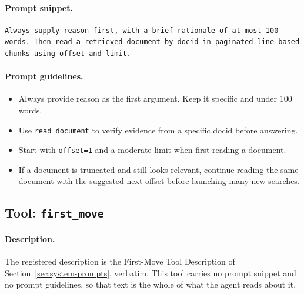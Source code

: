 \paragraph{Prompt snippet.}
\begin{verbatim}
Always supply reason first, with a brief rationale of at most 100
words. Then read a retrieved document by docid in paginated line-based
chunks using offset and limit.
\end{verbatim}

\paragraph{Prompt guidelines.}
\begin{itemize}
  \item Always provide reason as the first argument. Keep it specific and under 100 words.
  \item Use \texttt{read\_document} to verify evidence from a specific docid before answering.
  \item Start with \texttt{offset=1} and a moderate limit when first reading a document.
  \item If a document is truncated and still looks relevant, continue reading the same document with the suggested next offset before launching many new searches.
\end{itemize}


\subsection{Tool: {\tt first\_move}}
\label{tool:first-move}

\paragraph{Description.}
The registered description is the First-Move Tool Description of
Section~\ref{sec:system-prompts}, verbatim. This tool carries no prompt snippet
and no prompt guidelines, so that text is the whole of what the agent reads
about it.

